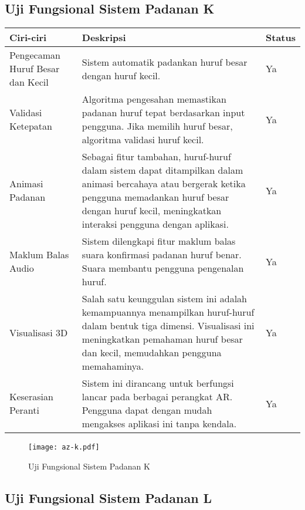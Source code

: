 \begin{itemize}
\begin{itemize}
\begin{itemize}
\begin{itemize}
\begin{itemize}
\begin{itemize}
\begin{itemize}
\begin{itemize}
\begin{flushleft}
\subsection{Uji Fungsional  Sistem Padanan K}

\begin{tabular}{>{\raggedright}p{3cm}p{9cm}>{\centering\arraybackslash}p{2cm}}
\toprule
\textbf{Ciri-ciri} & \textbf{Deskripsi} & \textbf{Status} \\
\midrule
Pengecaman Huruf Besar dan Kecil & Sistem automatik padankan huruf besar dengan huruf kecil. & Ya \\

Validasi Ketepatan & Algoritma pengesahan memastikan padanan huruf tepat berdasarkan input pengguna. Jika memilih huruf besar, algoritma validasi huruf kecil. & Ya \\

Animasi Padanan & Sebagai fitur tambahan, huruf-huruf dalam sistem dapat ditampilkan dalam animasi bercahaya atau bergerak ketika pengguna memadankan huruf besar dengan huruf kecil, meningkatkan interaksi pengguna dengan aplikasi. & Ya \\

Maklum Balas Audio & Sistem dilengkapi fitur maklum balas suara konfirmasi padanan huruf benar. Suara membantu pengguna pengenalan huruf. & Ya \\

Visualisasi 3D & Salah satu keunggulan sistem ini adalah kemampuannya menampilkan huruf-huruf dalam bentuk tiga dimensi. Visualisasi ini meningkatkan pemahaman huruf besar dan kecil, memudahkan pengguna memahaminya. & Ya \\

Keserasian Peranti & Sistem ini dirancang untuk berfungsi lancar pada berbagai perangkat AR. Pengguna dapat dengan mudah mengakses aplikasi ini tanpa kendala. & Ya \\
\bottomrule
\end{tabular}

\begin{figure}
    \centering
    \texttt{[image: az-k.pdf]}
    \caption{Uji Fungsional  Sistem Padanan K }
    \label{fig:az-k.pdf}
\end{figure}


\subsection{Uji Fungsional  Sistem Padanan L}


\end{flushleft}
\end{itemize}
\end{itemize}
\end{itemize}
\end{itemize}
\end{itemize}
\end{itemize}
\end{itemize}
\end{itemize}
